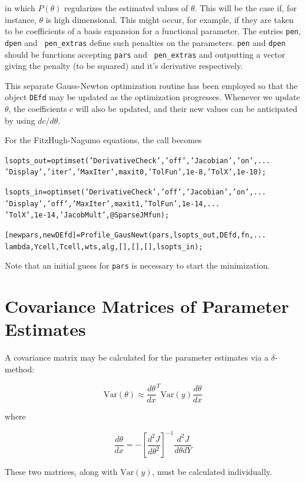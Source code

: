 \documentclass{article}
\newcommand{\Var}   {\ensuremath{\mathrm{Var}}}
\newcommand{\nt}    {\noindent}
\begin{document}
\nt in which $P(\theta)$ regularizes the estimated values
of $\theta$. This will be the case if, for instance,
$\theta$ is high dimensional. This might occur, for
example, if they are taken to be coefficients of a basis
expansion for a functional parameter.
The entries {\tt pen}, {\tt dpen} and {\tt
pen\_extras} define such penalties on the parameters.
{\tt pen} and {\tt dpen} should be functions accepting
{\tt pars} and {\tt
pen\_extras} and outputting a vector giving the penalty (to
be squared) and it's derivative respectively.

This separate Gauss-Newton optimization routine has been
employed so that the object {\tt DEfd} may be updated as
the optimization progresses. Whenever we update $\theta$,
the coefficients $c$ will also be updated, and their new
values can be anticipated by using $dc/d\theta$.


\nt For the FitzHugh-Nagumo equations, the call becomes

\begin{alltt}
 lsopts_out = optimset('DerivativeCheck','off','Jacobian','on',...
   'Display','iter','MaxIter',maxit0,'TolFun',1e-8,'TolX',1e-10);

 lsopts_in = optimset('DerivativeCheck','off','Jacobian','on',...
     'Display','off','MaxIter',maxit1,'TolFun',1e-14,...
     'TolX',1e-14,'JacobMult',@SparseJMfun);

 [newpars,newDEfd] = Profile_GausNewt(pars,lsopts_out,DEfd,fn,...
     lambda,Ycell,Tcell,wts,alg,[],[],[],lsopts_in);
\end{alltt}

\nt Note that an initial guess for {\tt pars} is necessary to start the
minimization.

\section{Covariance Matrices of Parameter Estimates} \label{covariance}

A covariance matrix may be calculated for the parameter estimates via
a $\delta$-method:

\[ \Var(\theta) \approx \frac{d \theta}{dx}^T \Var(y) \frac{d
  \theta}{dx} \]

\nt where

\[ \frac{d \theta}{dx} = - \left[\frac{d^2J}{d\theta^2}\right]^{-1}
\frac{d^2J}{d\theta dY} \]

\nt These two matrices, along with $\Var(y)$, must be calculated individually.
\end{document}
